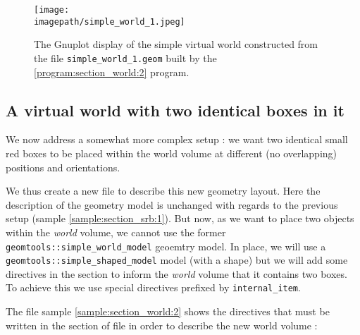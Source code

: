 \begin{figure}[h]
\begin{center}
\texttt{[image: \\imagepath/simple\_world\_1.jpeg]}
\end{center}
\caption{The Gnuplot  display of the simple  virtual world constructed
  from   the   file   \texttt{simple\_world\_1.geom}  built   by   the
  \ref{program:section_world:2}
  program.}\label{fig:mf:simple_world_1:a}
\end{figure}

\begin{sample}[hp]
\caption{The     GDML     file     generated    by     the     program
  \ref{program:section_world:2}  from  the   setup  described  in  the
   file. Here a default list of materials is
  added by  the driver. In  a practical case,  a list of  materials is
  inserted by an external software agent.}
\label{sample:gdml:1}
\end{sample}

\clearpage

\subsection{A virtual world with two identical boxes in it}

We now address  a somewhat more complex setup :  we want two identical
small  red boxes to  be placed  within the  world volume  at different
(no overlapping) positions and orientations.

We  thus create  a new   file  to describe  this new
geometry  layout.  Here  the description  of  the 
geometry model is unchanged with regards to the previous setup (sample
\ref{sample:section_srb:1}). But now, as  we want to place two objects
within   the   \emph{world}  volume,   we   cannot   use  the   former
\texttt{geomtools::simple\_world\_model} geoemtry model.  In place, we
will  use a  \texttt{geomtools::simple\_shaped\_model}  model (with  a
  shape) but  we will  add some  directives in  the 
section  to  inform  the  \emph{world}  volume that  it  contains  two
boxes.  To  achieve  this   we  use  special  directives  prefixed  by
\texttt{internal\_item}.

\pn The file  sample \ref{sample:section_world:2} shows the directives
that   must   be  written   in   the      section  of   file
 in order to describe the new world volume :
\begin{sample}
\caption{The \emph{world}
  section of the   file.}
\label{sample:section_world:2}
\end{sample}

